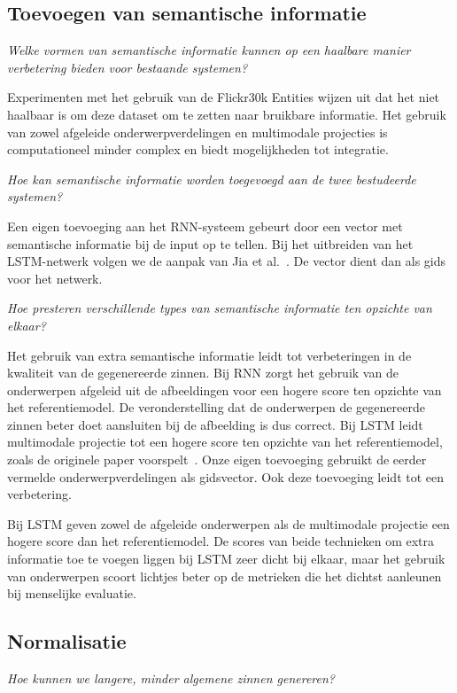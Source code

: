 \subsection{Toevoegen van semantische informatie}
\emph{Welke vormen van semantische informatie kunnen op een haalbare manier verbetering bieden voor bestaande systemen?}

Experimenten met het gebruik van de Flickr30k Entities wijzen uit dat het niet haalbaar is om deze dataset om te zetten naar bruikbare informatie. Het gebruik van zowel afgeleide onderwerpverdelingen en multimodale projecties is computationeel minder complex en biedt mogelijkheden tot integratie.

\emph{Hoe kan semantische informatie worden toegevoegd aan de twee bestudeerde systemen?}

Een eigen toevoeging aan het RNN-systeem gebeurt door een vector met semantische informatie bij de input op te tellen. Bij het uitbreiden van het LSTM-netwerk volgen we de aanpak van Jia et al.~\cite{Fernando2015}. De vector dient dan als gids voor het netwerk.

\emph{Hoe presteren verschillende types van semantische informatie ten opzichte van elkaar?}

Het gebruik van extra semantische informatie leidt tot verbeteringen in de kwaliteit van de gegenereerde zinnen. 
Bij RNN zorgt het gebruik van de onderwerpen afgeleid uit de afbeeldingen voor een hogere score ten opzichte van het referentiemodel. 
De veronderstelling dat de onderwerpen de gegenereerde zinnen beter doet aansluiten bij de afbeelding is dus correct.
Bij LSTM leidt multimodale projectie tot een hogere score ten opzichte van het referentiemodel, zoals de originele paper voorspelt~\cite{Fernando2015}. Onze eigen toevoeging gebruikt de eerder vermelde onderwerpverdelingen als gidsvector. Ook deze toevoeging leidt tot een verbetering.

Bij LSTM geven zowel de afgeleide onderwerpen als de multimodale projectie een hogere score dan het referentiemodel. 
De scores van beide technieken om extra informatie toe te voegen liggen bij LSTM zeer dicht bij elkaar, maar het gebruik van onderwerpen scoort lichtjes beter op de metrieken die het dichtst aanleunen bij menselijke evaluatie.

\subsection{Normalisatie}
\emph{Hoe kunnen we langere, minder algemene zinnen genereren?}

